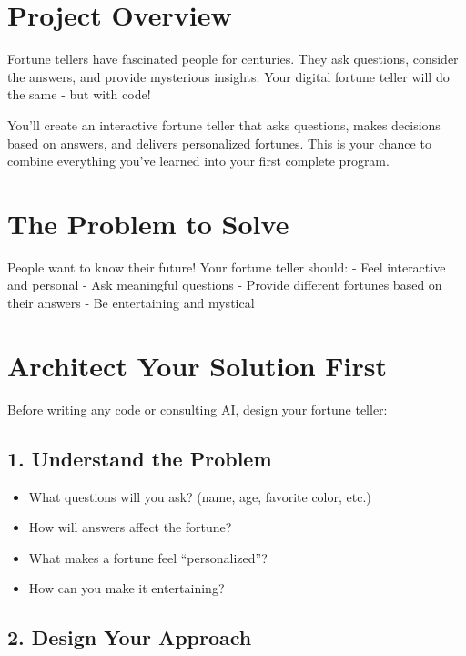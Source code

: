 \documentclass[
  letterpaper,
  DIV=11,
  numbers=noendperiod,
  oneside]{scrreprt}
\providecommand{\tightlist}{%
  \setlength{\itemsep}{0pt}\setlength{\parskip}{0pt}}\usepackage{longtable,booktabs,array}
\begin{document}
\section{Project Overview}\label{project-overview}

Fortune tellers have fascinated people for centuries. They ask
questions, consider the answers, and provide mysterious insights. Your
digital fortune teller will do the same - but with code!

You'll create an interactive fortune teller that asks questions, makes
decisions based on answers, and delivers personalized fortunes. This is
your chance to combine everything you've learned into your first
complete program.

\section{The Problem to Solve}\label{the-problem-to-solve}

People want to know their future! Your fortune teller should: - Feel
interactive and personal - Ask meaningful questions - Provide different
fortunes based on their answers - Be entertaining and mystical

\section{Architect Your Solution
First}\label{architect-your-solution-first}

Before writing any code or consulting AI, design your fortune teller:

\subsection{1. Understand the Problem}\label{understand-the-problem}

\begin{itemize}
\tightlist
\item
  What questions will you ask? (name, age, favorite color, etc.)
\item
  How will answers affect the fortune?
\item
  What makes a fortune feel ``personalized''?
\item
  How can you make it entertaining?
\end{itemize}

\subsection{2. Design Your Approach}\label{design-your-approach}
\end{document}
